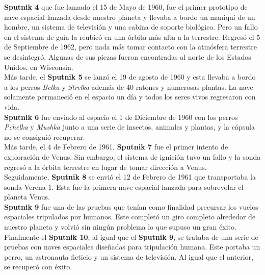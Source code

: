 \textbf{Sputnik 4} que fue lanzado el 15 de Mayo de 1960, fue el primer prototipo de nave espacial lanzada desde nuestro planeta y llevaba a bordo un maniquí de un hombre, un sistema de televisión y una cabina de soporte biológico. Pero un fallo en el sistema de guía la reubicó en una órbita más alta a la terrestre. Regresó el 5 de Septiembre de 1962, pero nada más tomar contacto con la atmósfera terrestre se desintegró. Algunas de sus piezas fueron encontradas al norte de los Estados Unidos, en Wisconsin.\\

Más tarde, el \textbf{Sputnik 5} se lanzó el 19 de agosto de 1960 y esta llevaba a bordo a los perros \textit{Belka} y \textit{Strelka} además de 40 ratones y numerosas plantas. La nave solamente permaneció en el espacio un día y todos los seres vivos regresaron con vida.\\

\textbf{Sputnik 6} fue enviado al espacio el 1 de Diciembre de 1960 con los perros \textit{Pchelka} y \textit{Mushka} junto a una serie de insectos, animales y plantas, y la cápsula no se consiguió recuperar. \\

Más tarde, el 4 de Febrero de 1961, \textbf{Sputnik 7} fue el primer intento de exploración de Venus. Sin embargo, el sistema de ignición tuvo un fallo y la sonda regresó a la órbita terrestre en lugar de tomar dirección a Venus.\\

Seguidamente, \textbf{Sputnik 8} se envió el 12 de Febrero de 1961 que transportaba la sonda Verena 1. Esta fue la primera nave espacial lanzada para sobrevolar el planeta Venus.\\

\textbf{Sputnik 9} fue una de las pruebas que tenían como finalidad precursar los vuelos espaciales tripulados por humanos. Este completó un giro completo alrededor de nuestro planeta y volvió sin ningún problema lo que supuso un gran éxito.\\

Finalmente el \textbf{Sputnik 10}, al igual que el \textbf{Sputnik 9}, se trataba de una serie de pruebas con naves espaciales diseñadas para tripulación humana. Este portaba un perro, un astronauta ficticio y un sistema de televisión. Al igual que el anterior, se recuperó con éxito.

